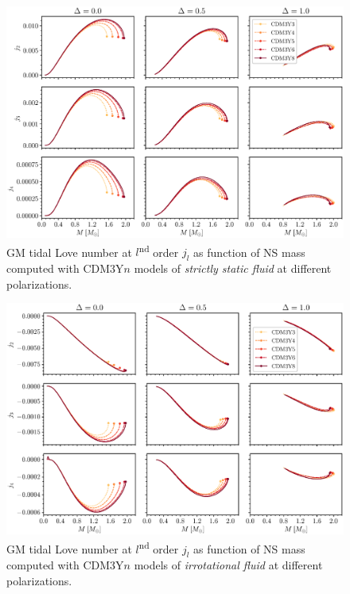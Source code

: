 \begin{figure}[ht!]
        \centering
        \includegraphics[width=\textwidth]{fig/jl_stat.eps}
        \caption{\gls{GM} tidal Love number at $l$\textsuperscript{nd} order $j_l$ as function of \gls{NS} mass computed with CDM3Y$n$ models of \emph{strictly static fluid} at different polarizations.}
        \label{fig:jl_stat}
\end{figure} 
\begin{figure}[ht!]
        \centering
        \includegraphics[width=\textwidth]{fig/jl_irrot.eps}
        \caption{\gls{GM} tidal Love number at $l$\textsuperscript{nd} order $j_l$ as function of \gls{NS} mass computed with CDM3Y$n$ models of \emph{irrotational fluid} at different polarizations.}
        \label{fig:jl_irrot}
\end{figure} 
